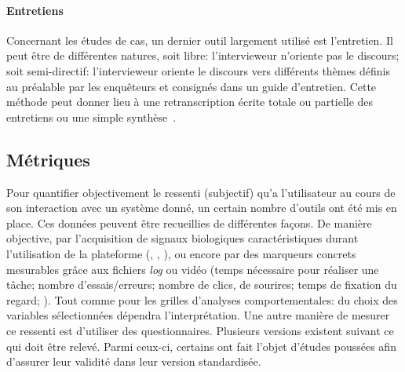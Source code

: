     \paragraph{Entretiens}
        Concernant les études de cas, un dernier outil largement utilisé est l'entretien. Il peut être de différentes natures, soit libre: l'intervieweur n'oriente pas le discours; soit semi-directif: l'intervieweur oriente le discours vers différents thèmes définis au préalable par les enquêteurs et consignés dans un guide d’entretien. Cette méthode peut donner lieu à une retranscription écrite totale ou partielle des entretiens ou une simple synthèse~.
  \subsection{Métriques}
    Pour quantifier objectivement le ressenti (subjectif) qu'a l'utilisateur au cours de son interaction avec un système donné, un certain nombre d'outils ont été mis en place. Ces données peuvent être recueillies de différentes façons. 
    De manière objective, par l'acquisition de signaux biologiques caractéristiques durant l'utilisation de la plateforme (\eg {}, , \etc), ou encore par des marqueurs concrets mesurables grâce aux fichiers \textit{log} ou vidéo (\eg temps nécessaire pour réaliser une tâche; nombre d'essais/erreurs; nombre de clics, de sourires; temps de fixation du regard; \etc). Tout comme pour les grilles d'analyses comportementales: du choix des variables sélectionnées dépendra l'interprétation. 
    Une autre manière de mesurer ce ressenti est d'utiliser des questionnaires. Plusieurs versions existent suivant ce qui doit être relevé. Parmi ceux-ci, certains ont fait l'objet d'études poussées afin d'assurer leur validité dans leur version standardisée.\nocite{tricot:edutice-00000154}
